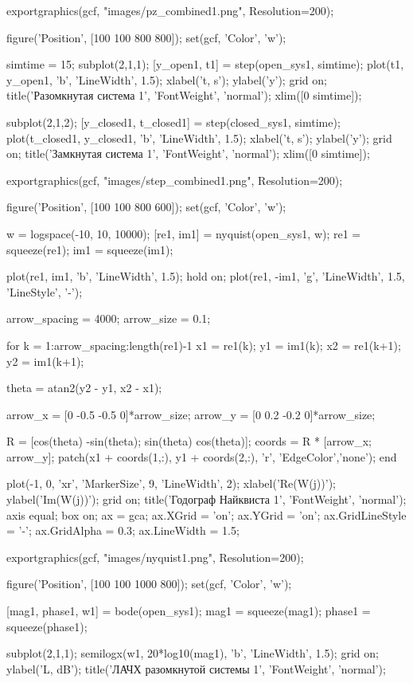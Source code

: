 \begin{matlabcode}
exportgraphics(gcf, "images/pz_combined1.png", Resolution=200);

figure('Position', [100 100 800 800]);
set(gcf, 'Color', 'w');

simtime = 15;
subplot(2,1,1);
[y_open1, t1] = step(open_sys1, simtime);
plot(t1, y_open1, 'b', 'LineWidth', 1.5);
xlabel('t, s');
ylabel('y');
grid on;
title('Разомкнутая система 1', 'FontWeight', 'normal');
xlim([0 simtime]);

subplot(2,1,2);
[y_closed1, t_closed1] = step(closed_sys1, simtime);
plot(t_closed1, y_closed1, 'b', 'LineWidth', 1.5);
xlabel('t, s');
ylabel('y');
grid on;
title('Замкнутая система 1', 'FontWeight', 'normal');
xlim([0 simtime]);

exportgraphics(gcf, "images/step_combined1.png", Resolution=200);

figure('Position', [100 100 800 600]);
set(gcf, 'Color', 'w');

w = logspace(-10, 10, 10000);
[re1, im1] = nyquist(open_sys1, w);
re1 = squeeze(re1);
im1 = squeeze(im1);

plot(re1, im1, 'b', 'LineWidth', 1.5);
hold on;
plot(re1, -im1, 'g', 'LineWidth', 1.5, 'LineStyle', '-');

arrow_spacing = 4000;
arrow_size = 0.1;

for k = 1:arrow_spacing:length(re1)-1
    x1 = re1(k);
    y1 = im1(k);
    x2 = re1(k+1);
    y2 = im1(k+1);

    theta = atan2(y2 - y1, x2 - x1);

    arrow_x = [0 -0.5 -0.5 0]*arrow_size;
    arrow_y = [0 0.2 -0.2 0]*arrow_size;

    R = [cos(theta) -sin(theta); sin(theta) cos(theta)];
    coords = R * [arrow_x; arrow_y];
    patch(x1 + coords(1,:), y1 + coords(2,:), 'r', 'EdgeColor','none');
end

plot(-1, 0, 'xr', 'MarkerSize', 9, 'LineWidth', 2);
xlabel('Re(W(j\omega))');
ylabel('Im(W(j\omega))');
grid on;
title('Годограф Найквиста 1', 'FontWeight', 'normal');
axis equal;
box on;
ax = gca;
ax.XGrid = 'on';
ax.YGrid = 'on';
ax.GridLineStyle = '-';
ax.GridAlpha = 0.3;
ax.LineWidth = 1.5;

exportgraphics(gcf, "images/nyquist1.png", Resolution=200);

figure('Position', [100 100 1000 800]);
set(gcf, 'Color', 'w');

[mag1, phase1, w1] = bode(open_sys1);
mag1 = squeeze(mag1);
phase1 = squeeze(phase1);

subplot(2,1,1);
semilogx(w1, 20*log10(mag1), 'b', 'LineWidth', 1.5);
grid on;
ylabel('L, dB');
title('ЛАЧХ разомкнутой системы 1', 'FontWeight', 'normal');


\end{matlabcode}
